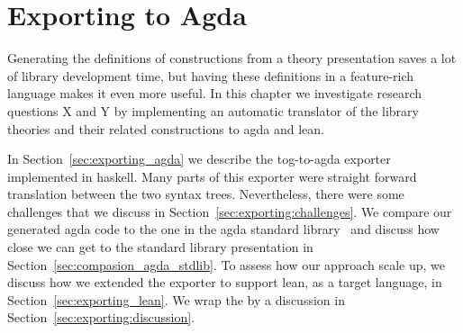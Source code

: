 \chapter{Exporting to Agda}
\label{ch:export}


Generating the definitions of constructions from a theory presentation saves a lot of library development time, but having these definitions in a feature-rich language makes it even more useful. In this chapter we investigate research questions X and Y by implementing an automatic translator of the library theories and their related constructions to agda and lean. 

In Section~\ref{sec:exporting_agda} we describe the tog-to-agda exporter implemented in haskell. Many parts of this exporter were straight forward translation between the two syntax trees. Nevertheless, there were some challenges that we discuss in Section~\ref{sec:exporting:challenges}. We compare our generated agda code to the one in the agda standard library~\cite{agda_stdlib} and discuss how close we can get to the standard library presentation in Section~\ref{sec:compasion_agda_stdlib}. To assess how our approach scale up, we discuss how we extended the exporter to support lean, as a target language, in Section~\ref{sec:exporting_lean}. We wrap the by a discussion in Section~\ref{sec:exporting:discussion}. 

\begin{comment}
One of the problems we highlight here is how design decisions lead to different presentations of the same theory, forcing developers to rewrite the same mathematical knowledge in different ways. In this chapter, we investigate the following question
\begin{itemize}
\item Given the tog abstract representation, can we export to formal systems with more complex meta theory and design decision. 
\end{itemize}
\end{comment}

